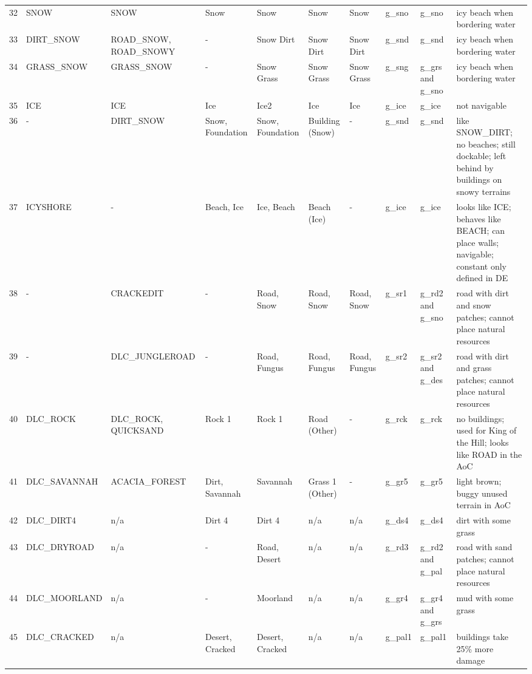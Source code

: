 \begin{appendices}
\begin{landscape}
\begin{longtable}{@{}p{5mm}|p{25mm}p{23mm}|p{14mm}p{14mm}p{14mm}p{14mm}|p{10mm}p{15mm}|p{45mm}@{}}
            32	& SNOW	& SNOW	& Snow	& Snow	& Snow	& Snow	& g\_sno	& g\_sno		& icy beach when bordering water \\
            33	& DIRT\_SNOW	& ROAD\_SNOW, ROAD\_SNOWY	& -	& Snow Dirt	& Snow Dirt	& Snow Dirt	& g\_snd	& g\_snd		& icy beach when bordering water \\
            34	& GRASS\_SNOW	& GRASS\_SNOW	& -	& Snow Grass	& Snow Grass	& Snow Grass	& g\_sng	& g\_grs and g\_sno		& icy beach when bordering water \\
            35	& ICE	& ICE	& Ice	& Ice2	& Ice	& Ice	& g\_ice	& g\_ice		& not navigable \\
            36	& -	& DIRT\_SNOW	& Snow, Foundation	& Snow, Foundation	& Building (Snow)	& -	& g\_snd	& g\_snd		& like SNOW\_DIRT; no beaches; still dockable; left behind by buildings on snowy terrains \\
            37	&  ICYSHORE	& -	& Beach, Ice	& Ice, Beach	& Beach (Ice)	& -	& g\_ice	& g\_ice		& looks like ICE; behaves like BEACH; can place walls; navigable; constant only defined in DE \\
            38	& -	& CRACKEDIT	& -	& Road, Snow	& Road, Snow	& Road, Snow	& g\_sr1	& g\_rd2 and g\_sno		& road with dirt and snow patches; cannot place natural resources \\
            39	& -	& DLC\_JUNGLEROAD	& -	& Road, Fungus	& Road, Fungus	& Road, Fungus	& g\_sr2	& g\_sr2 and g\_des		& road with dirt and grass patches; cannot place natural resources \\
            40	& DLC\_ROCK	& DLC\_ROCK, QUICKSAND	& Rock 1	& Rock 1	& Road (Other)	& -	& g\_rck	& g\_rck		& no buildings; used for King of the Hill; looks like ROAD in the AoC \\
            41	& DLC\_SAVANNAH	& ACACIA\_FOREST	& Dirt, Savannah	& Savannah	& Grass 1 (Other)	& -	& g\_gr5	& g\_gr5		& light brown; buggy unused terrain in AoC  \\
            42	& DLC\_DIRT4	& n/a	& Dirt 4	& Dirt 4	& n/a	& n/a	& g\_ds4	& g\_ds4		& dirt with some grass \\
            43	& DLC\_DRYROAD	& n/a	& -	& Road, Desert	& n/a	& n/a	& g\_rd3	& g\_rd2 and g\_pal		& road with sand patches; cannot place natural resources \\
            44	& DLC\_MOORLAND	& n/a	& -	& Moorland	& n/a	& n/a	& g\_gr4	& g\_gr4 and g\_grs		& mud with some grass \\
            45	& DLC\_CRACKED	& n/a	& Desert, Cracked	& Desert, Cracked	& n/a	& n/a	& g\_pal1	& g\_pal1		& buildings take 25\% more damage \\

\end{longtable}
\end{landscape}
\end{appendices}
